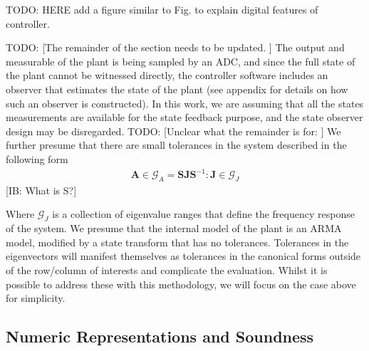 \documentclass[runningheads,a4paper]{llncs}
\newcommand{\todo}[1]{{\color{red} TODO: #1}}
\newcommand{\commentib}[1]{{\color{blue} [IB: #1]}}
\newcommand{\mat}[1]{\boldsymbol{#1}}
\begin{document}
\todo{HERE add a figure similar to Fig. \label{fig:observersystem} to explain digital features of controller.} 

\todo{[The remainder of the section needs to be updated. ]}
The output and measurable of the plant is being sampled by an ADC, and since the full state of the
plant cannot be witnessed directly, the controller software includes an observer that 
estimates the state of the plant (see appendix for details on how such an observer
is constructed). In this work, we are assuming that all the states measurements are available for the state feedback purpose, and the state observer design may be disregarded.  
\todo{[Unclear what the remainder is for: ]}
We further presume that there are small tolerances in the system 
described in the following form
%
\begin{align*}
\mat{A} \in \mathcal{G}_A=\mat{S}\mat{J}\mat{S}^{-1} : \mat{J} \in \mathcal{G}_J
\end{align*}
\commentib{What is S?}

Where $\mathcal{G}_J$ is a collection of eigenvalue ranges that define the frequency response of the system.
We presume that the internal model of the plant is an ARMA model, modified by a
state transform that has no tolerances. Tolerances in the eigenvectors will manifest themselves
as tolerances in the canonical forms outside of the row/column of interests and complicate the 
evaluation. Whilst it is possible to address these with this methodology, we will focus on the case
above for simplicity.

\subsection{Numeric Representations and Soundness} 
\label{sec:numeric_rep}
\end{document}
